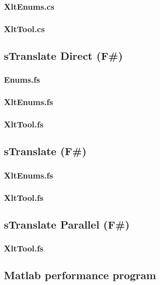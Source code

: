 \documentclass[12pt, a4paper]{article}
\begin{document}
\subsubsection{XltEnums.cs}

\newpage
\subsubsection{XltTool.cs}


\newpage
\subsection{sTranslate Direct (F\#)}
\label{AppendixFSharpDirect}
\subsubsection{Enums.fs}

\newpage
\subsubsection{XltEnums.fs}

\newpage
\subsubsection{XltTool.fs}


\newpage
\subsection{sTranslate (F\#)}
\label{AppendixFSharp}
\subsubsection{XltEnums.fs}

\newpage
\subsubsection{XltTool.fs}


\newpage
\subsection{sTranslate Parallel (F\#)}
\label{AppendixFSharpParallel}
\subsubsection{XltTool.fs}


\newpage
\subsection{Matlab performance program}

\end{document}
